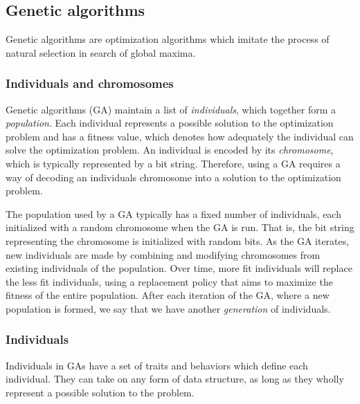 \subsection{Genetic algorithms} 
Genetic algorithms are optimization algorithms which imitate the process of natural selection in search of global maxima.

\subsubsection{Individuals and chromosomes}
Genetic algorithms (GA) maintain a list of \emph{individuals}, which together form a \emph{population}. Each individual represents a possible solution to the optimization problem and has a fitness value, which denotes how adequately the individual can solve the optimization problem. An individual is encoded by its \emph{chromosome}, which is typically represented by a bit string. Therefore, using a GA requires a way of decoding an individuals chromosome into a solution to the optimization problem.

The population used by a GA typically has a fixed number of individuals, each initialized with a random chromosome when the GA is run. That is, the bit string representing the chromosome is initialized with random bits. As the GA iterates, new individuals are made by combining and modifying chromosomes from existing individuals of the population. Over time, more fit individuals will replace the less fit individuals, using a replacement policy that aims to maximize the fitness of the entire population. After each iteration of the GA, where a new population is formed, we say that we have another \emph{generation} of individuals.

\subsubsection{Individuals}
Individuals in GAs have a set of traits and behaviors which define each individual. They can take on any form of data structure, as long as they wholly represent a possible solution to the problem. 



